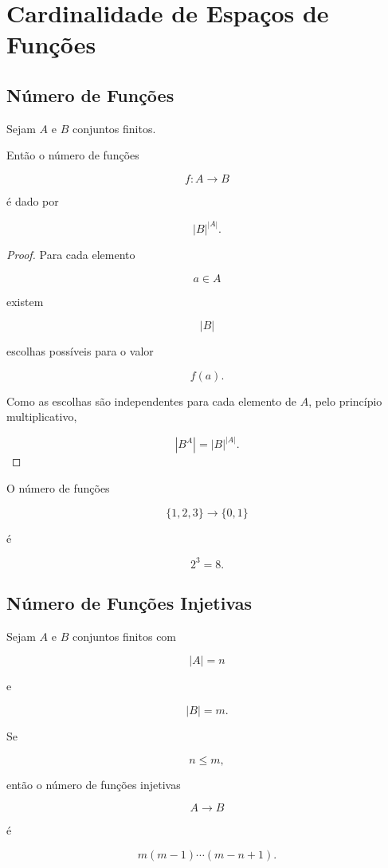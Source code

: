\documentclass[../../main]{subfiles}
\begin{document}
\section{Cardinalidade de Espaços de Funções}
\label{sec:matematica:funcoes:cardinalidade}

\subsection{Número de Funções}

\begin{prop}
	\label{prop:matematica:funcoes:cardinalidade:numero-funcoes}

	Sejam \(A\) e \(B\) conjuntos finitos.

	Então o número de funções

	\[
		f:A\to B
	\]

	é dado por

	\[
		|B|^{|A|}.
	\]

\end{prop}

\begin{proof}

	Para cada elemento

	\[
		a\in A
	\]

	existem

	\[
		|B|
	\]

	escolhas possíveis para o valor

	\[
		f(a).
	\]

	Como as escolhas são independentes para cada elemento de \(A\),
	pelo princípio multiplicativo,

	\[
		|B^A|
		=
		|B|^{|A|}.
	\]

\end{proof}

\begin{ex}

	O número de funções

	\[
		\{1,2,3\}
		\to
		\{0,1\}
	\]

	é

	\[
		2^3
		=
		8.
	\]

\end{ex}

\subsection{Número de Funções Injetivas}

\begin{prop}
	\label{prop:matematica:funcoes:cardinalidade:injetivas}

	Sejam \(A\) e \(B\) conjuntos finitos com

	\[
		|A|=n
	\]

	e

	\[
		|B|=m.
	\]

	Se

	\[
		n\le m,
	\]

	então o número de funções injetivas

	\[
		A\to B
	\]

	é

	\[
		m(m-1)\cdots(m-n+1).
	\]

\end{prop}
\end{document}
